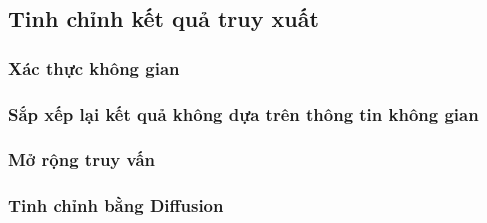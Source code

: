 \subsection{Tinh chỉnh kết quả truy xuất}

\subsubsection{Xác thực không gian}

\subsubsection{Sắp xếp lại kết quả không dựa trên thông tin không gian}

\subsubsection{Mở rộng truy vấn}

\subsubsection{Tinh chỉnh bằng Diffusion}
